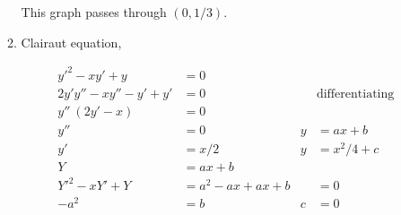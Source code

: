 \begin{enumerate}
\begin{enumerate}
                    This graph passes through $ (0, 1/3) $.
                    \begin{figure}[H]
                        \centering
                    \end{figure}
              \item Clairaut equation,

                    \begin{align}
                        y'^{2}- xy' + y       & = 0                                               \\
                        2y'y'' -xy'' - y' +y' & = 0                  &   & \text{differentiating} \\
                        y''\ (2y' - x)        & = 0                                               \\
                        y''                   & = 0                  & y & = ax + b               \\
                        y'                    & = x/2                & y & = x^{2}/4 + c          \\
                        Y                     & = ax + b                                          \\
                        Y'^{2}- xY' + Y       & =a^{2} - ax + ax + b &   & = 0                    \\
                        -a^{2}                & = b                  & c & = 0
                    \end{align}


\end{enumerate}
\end{enumerate}
